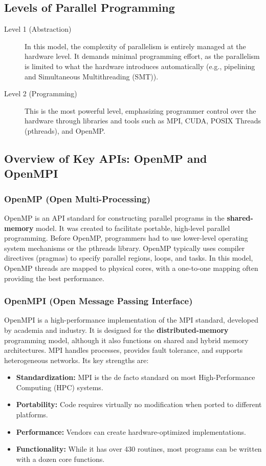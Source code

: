 \subsection{Levels of Parallel Programming}
\begin{description}
    \item[Level 1 (Abstraction)] In this model, the complexity of parallelism is entirely managed at the hardware level. It demands minimal programming effort, as the parallelism is limited to what the hardware introduces automatically (e.g., pipelining and Simultaneous Multithreading (SMT)).
    \item[Level 2 (Programming)] This is the most powerful level, emphasizing programmer control over the hardware through libraries and tools such as MPI, CUDA, POSIX Threads (pthreads), and OpenMP.
\end{description}

\subsection{Overview of Key APIs: OpenMP and OpenMPI}

\subsubsection{OpenMP (Open Multi-Processing)}
OpenMP is an API standard for constructing parallel programs in the \textbf{shared-memory} model. It was created to facilitate portable, high-level parallel programming. Before OpenMP, programmers had to use lower-level operating system mechanisms or the pthreads library. OpenMP typically uses compiler directives (pragmas) to specify parallel regions, loops, and tasks. In this model, OpenMP threads are mapped to physical cores, with a one-to-one mapping often providing the best performance.

\subsubsection{OpenMPI (Open Message Passing Interface)}
OpenMPI is a high-performance implementation of the MPI standard, developed by academia and industry. It is designed for the \textbf{distributed-memory} programming model, although it also functions on shared and hybrid memory architectures. MPI handles processes, provides fault tolerance, and supports heterogeneous networks. Its key strengths are:
\begin{itemize}
    \item \textbf{Standardization:} MPI is the de facto standard on most High-Performance Computing (HPC) systems.
    \item \textbf{Portability:} Code requires virtually no modification when ported to different platforms.
    \item \textbf{Performance:} Vendors can create hardware-optimized implementations.
    \item \textbf{Functionality:} While it has over 430 routines, most programs can be written with a dozen core functions.
\end{itemize}

